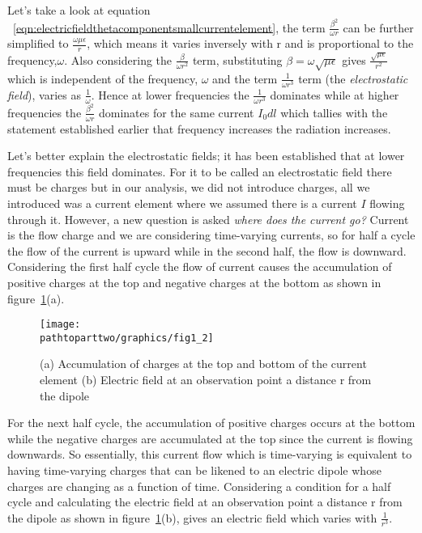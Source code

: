 Let's take a look at equation ~\eqref{eqn:electricfieldthetacomponentsmallcurrentelement}, the term $\frac{\beta^2}{\omega r}$ can be further simplified to $\frac{\omega \mu \epsilon}{r}$, which means it varies inversely with r and is proportional to the frequency,$\omega$. Also considering the $\frac{\beta}{\omega r^2}$ term, substituting $\beta = \omega \sqrt{\mu \epsilon}$ gives $\frac{\sqrt{\mu \epsilon}}{r^2}$ which is independent of the frequency, $\omega$ and the term $\frac{1}{\omega r^3}$ term (the \emph{electrostatic field}), varies as $\frac{1}{\omega }$. Hence at lower frequencies the $\frac{1}{\omega r^3}$ dominates while at higher frequencies the $\frac{\beta^2}{\omega r}$ dominates for the same current $I_0dl$ which tallies with the statement established earlier that frequency increases the radiation increases. 

Let's better explain the electrostatic fields; it has been established that at lower frequencies this field dominates. For it to be called an electrostatic field there must be charges but in our analysis, we did not introduce charges, all we introduced was a current element where we assumed there is a current $I$ flowing through it. However, a new question is asked \emph{where does the current go?} Current is the flow charge and we are considering time-varying currents, so for half a cycle the flow of the current is upward while in the second half, the flow is downward. Considering the first half cycle the flow of current causes the accumulation of positive charges at the top and negative charges at the bottom as shown in figure~\ref{fig:dipole}(a).
\begin{figure}[h]
\centering
\texttt{[image: \\pathtoparttwo/graphics/fig1\_2]}
\caption{(a) Accumulation of charges at the top and bottom of the current element (b) Electric field at an observation point a distance r from the dipole}
\label{fig:dipole}
\end{figure}

For the next half cycle, the accumulation of positive charges occurs at the bottom while the negative charges are accumulated at the top since the current is flowing downwards. So essentially, this current flow which is time-varying is equivalent to having time-varying charges that can be likened to an electric dipole whose charges are changing as a function of time. Considering a condition for a half cycle and calculating the electric field at an observation point a distance r from the dipole as shown in figure~\ref{fig:dipole}(b), gives an electric field which varies with $\frac{1}{r^3}$.

